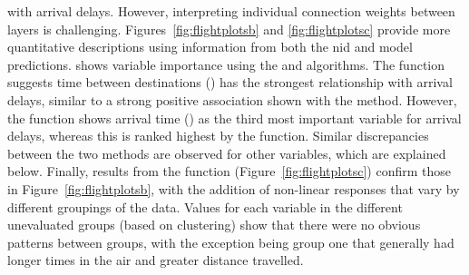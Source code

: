 \documentclass[article]{jss}
\begin{document}
with arrival delays.  However, interpreting individual connection weights 
between layers is challenging. Figures~\ref{fig:flightplotsb} and 
\ref{fig:flightplotsc} provide more quantitative descriptions using 
information from both the \ac{nid} and model predictions.  
 shows variable importance using the  
and  algorithms.  The  function suggests time 
between destinations () has the strongest relationship 
with arrival delays, similar to a strong positive association shown 
with the  method. However, the  function 
shows arrival time () as the third most important 
variable for arrival delays, whereas this is ranked highest by the 
function. Similar discrepancies between the two methods are observed
for other variables, which are explained below. Finally, results from
the  function (Figure~\ref{fig:flightplotsc}) confirm those
in Figure~\ref{fig:flightplotsb}, with the addition of non-linear responses
that vary by different groupings of the data.  Values for each
variable in the different unevaluated groups (based on clustering)
show that there were no obvious patterns between groups, with the
exception being group one that generally had longer times in the air 
and greater distance travelled.
\end{document}

